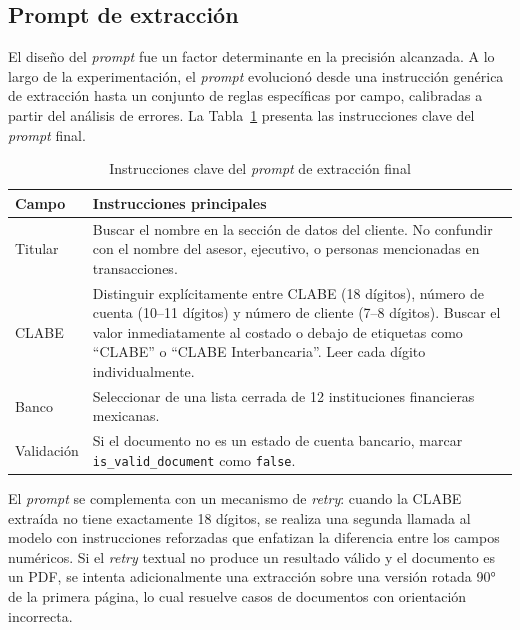 \subsection{Prompt de extracción}

El diseño del \textit{prompt} fue un factor determinante en la precisión alcanzada. A lo largo de la experimentación, el \textit{prompt} evolucionó desde una instrucción genérica de extracción hasta un conjunto de reglas específicas por campo, calibradas a partir del análisis de errores. La Tabla~\ref{tab:prompt-final} presenta las instrucciones clave del \textit{prompt} final.

\begin{table}[H]
\centering
\vspace{6pt}
\begin{tabular}{lp{10cm}}
\toprule
\textbf{Campo} & \textbf{Instrucciones principales} \\
\midrule
Titular & Buscar el nombre en la sección de datos del cliente. No confundir con el
nombre del asesor, ejecutivo, o personas mencionadas en transacciones. \\
CLABE & Distinguir explícitamente entre CLABE (18 dígitos), número de cuenta
(10--11 dígitos) y número de cliente (7--8 dígitos). Buscar el valor
inmediatamente al costado o debajo de etiquetas como ``CLABE'' o ``CLABE
Interbancaria''. Leer cada dígito individualmente. \\
Banco & Seleccionar de una lista cerrada de 12 instituciones financieras
mexicanas. \\
Validación & Si el documento no es un estado de cuenta bancario, marcar
\texttt{is\_valid\_document} como \texttt{false}. \\
\bottomrule
\end{tabular}
\caption{Instrucciones clave del \textit{prompt} de extracción final}
\label{tab:prompt-final}
\end{table}

El \textit{prompt} se complementa con un mecanismo de \textit{retry}: cuando la CLABE extraída no tiene exactamente 18 dígitos, se realiza una segunda llamada al modelo con instrucciones reforzadas que enfatizan la diferencia entre los campos numéricos. Si el \textit{retry} textual no produce un resultado válido y el documento es un PDF, se intenta adicionalmente una extracción sobre una versión rotada 90° de la primera página, lo cual resuelve casos de documentos con orientación incorrecta.


